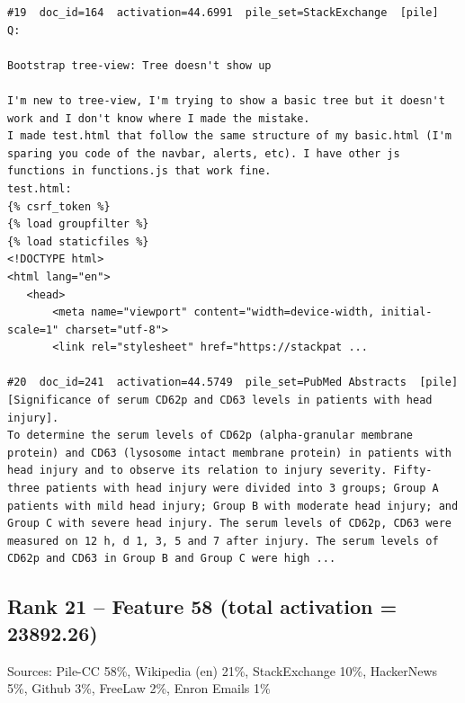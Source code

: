 \begin{verbatim}
#19  doc_id=164  activation=44.6991  pile_set=StackExchange  [pile]
Q:

Bootstrap tree-view: Tree doesn't show up

I'm new to tree-view, I'm trying to show a basic tree but it doesn't work and I don't know where I made the mistake.
I made test.html that follow the same structure of my basic.html (I'm sparing you code of the navbar, alerts, etc). I have other js functions in functions.js that work fine. 
test.html:
{% csrf_token %}
{% load groupfilter %}
{% load staticfiles %}
<!DOCTYPE html>
<html lang="en">
   <head>
       <meta name="viewport" content="width=device-width, initial-scale=1" charset="utf-8">
       <link rel="stylesheet" href="https://stackpat ...

#20  doc_id=241  activation=44.5749  pile_set=PubMed Abstracts  [pile]
[Significance of serum CD62p and CD63 levels in patients with head injury].
To determine the serum levels of CD62p (alpha-granular membrane protein) and CD63 (lysosome intact membrane protein) in patients with head injury and to observe its relation to injury severity. Fifty-three patients with head injury were divided into 3 groups; Group A patients with mild head injury; Group B with moderate head injury; and Group C with severe head injury. The serum levels of CD62p, CD63 were measured on 12 h, d 1, 3, 5 and 7 after injury. The serum levels of CD62p and CD63 in Group B and Group C were high ...

\end{verbatim}

\subsection*{Rank 21 -- Feature 58 (total activation = 23892.26)}

Sources: Pile-CC 58\%, Wikipedia (en) 21\%, StackExchange 10\%, HackerNews 5\%, Github 3\%, FreeLaw 2\%, Enron Emails 1\%

